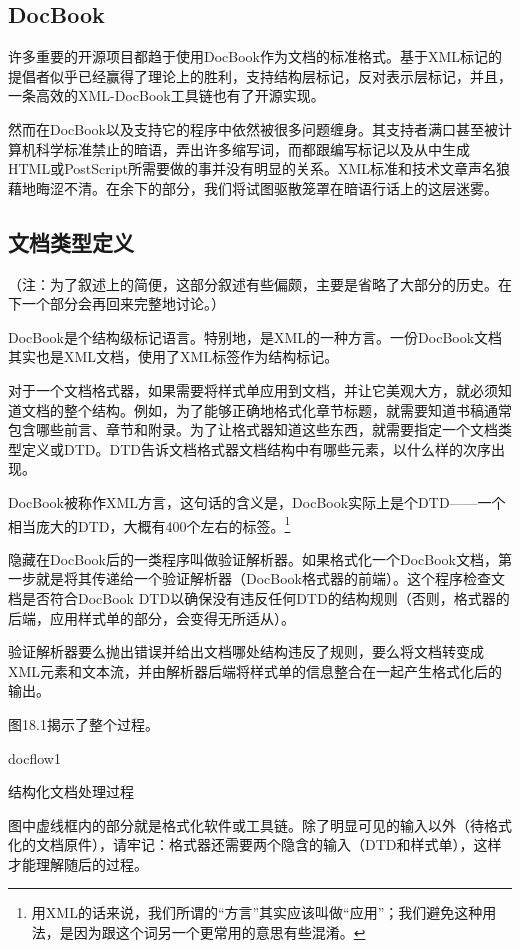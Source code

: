 \documentclass[12pt,oneside]{book}
\begin{document}
\begin{common-format}
\section{DocBook}
许多重要的开源项目都趋于使用DocBook作为文档的标准格式。基于XML标记的提倡者似乎已经赢得了理论上的胜利，支持结构层标记，反对表示层标记，并且，一条高效的XML-DocBook工具链也有了开源实现。

然而在DocBook以及支持它的程序中依然被很多问题缠身。其支持者满口甚至被计算机科学标准禁止的暗语，弄出许多缩写词，而都跟编写标记以及从中生成HTML或PostScript所需要做的事并没有明显的关系。XML标准和技术文章声名狼藉地晦涩不清。在余下的部分，我们将试图驱散笼罩在暗语行话上的这层迷雾。

\subsection{文档类型定义}
（注：为了叙述上的简便，这部分叙述有些偏颇，主要是省略了大部分的历史。在下一个部分会再回来完整地讨论。）

DocBook是个结构级标记语言。特别地，是XML的一种方言。一份DocBook文档其实也是XML文档，使用了XML标签作为结构标记。

对于一个文档格式器，如果需要将样式单应用到文档，并让它美观大方，就必须知道文档的整个结构。例如，为了能够正确地格式化章节标题，就需要知道书稿通常包含哪些前言、章节和附录。为了让格式器知道这些东西，就需要指定一个文档类型定义或DTD。DTD告诉文档格式器文档结构中有哪些元素，以什么样的次序出现。

DocBook被称作XML方言，这句话的含义是，DocBook实际上是个DTD——一个相当庞大的DTD，大概有400个左右的标签。\footnote{用XML的话来说，我们所谓的“方言”其实应该叫做“应用”；我们避免这种用法，是因为跟这个词另一个更常用的意思有些混淆。}

隐藏在DocBook后的一类程序叫做验证解析器。如果格式化一个DocBook文档，第一步就是将其传递给一个验证解析器（DocBook格式器的前端）。这个程序检查文档是否符合DocBook DTD以确保没有违反任何DTD的结构规则（否则，格式器的后端，应用样式单的部分，会变得无所适从）。

验证解析器要么抛出错误并给出文档哪处结构违反了规则，要么将文档转变成XML元素和文本流，并由解析器后端将样式单的信息整合在一起产生格式化后的输出。

图18.1揭示了整个过程。
\begin{fig}{docflow1}
\caption{结构化文档处理过程}
\label{fig:docflow1}
\end{fig}

图中虚线框内的部分就是格式化软件或工具链。除了明显可见的输入以外（待格式化的文档原件），请牢记：格式器还需要两个隐含的输入（DTD和样式单），这样才能理解随后的过程。


\end{common-format}
\end{document}
